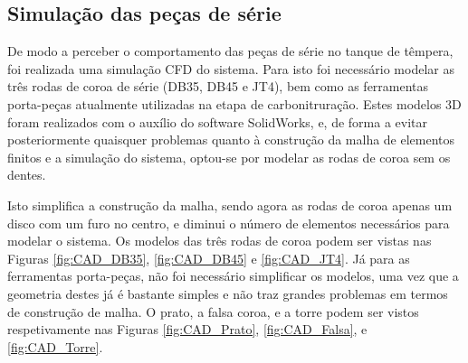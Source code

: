 \subsection{Simulação das peças de série} \label{ssec:materiais_concecao_sim_serie}
\par
De modo a perceber o comportamento das peças de série no tanque de têmpera, foi realizada uma simulação CFD do sistema. Para isto foi necessário modelar as três rodas de coroa de série (DB35, DB45 e JT4), bem como as ferramentas porta-peças atualmente utilizadas na etapa de carbonitruração. Estes modelos 3D foram realizados com o auxílio do software SolidWorks, e, de forma a evitar posteriormente quaisquer problemas quanto à construção da malha de elementos finitos e a simulação do sistema, optou-se por modelar as rodas de coroa sem os dentes.
\par
Isto simplifica a construção da malha, sendo agora as rodas de coroa apenas um disco com um furo no centro, e diminui o número de elementos necessários para modelar o sistema. Os modelos das três rodas de coroa podem ser vistas nas Figuras \ref{fig:CAD_DB35}, \ref{fig:CAD_DB45} e \ref{fig:CAD_JT4}. Já para as ferramentas porta-peças, não foi necessário simplificar os modelos, uma vez que a geometria destes já é bastante simples e não traz grandes problemas em termos de construção de malha. O prato, a falsa coroa, e a torre podem ser vistos respetivamente nas Figuras \ref{fig:CAD_Prato}, \ref{fig:CAD_Falsa}, e \ref{fig:CAD_Torre}.
